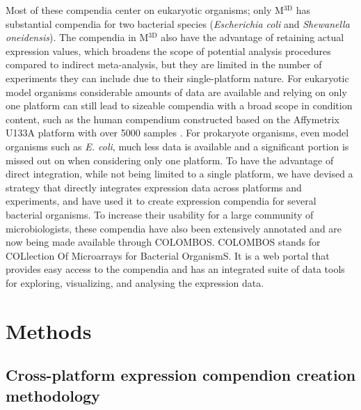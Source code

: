 Most of these compendia center on eukaryotic organisms; only M$^{\textrm{3D}}$ 
has substantial compendia for two bacterial species ({\it Escherichia coli} and 
{\it Shewanella oneidensis}). The compendia in M$^{\textrm{3D}}$ also have the 
advantage of retaining actual expression values, which broadens the scope of 
potential analysis procedures compared to indirect meta-analysis, but they are 
limited in the number of experiments they can include due to their 
single-platform nature. For eukaryotic model organisms considerable amounts of 
data are available and relying on only one platform can still lead to sizeable 
compendia with a broad scope in condition content, such as the human compendium 
constructed based on the Affymetrix U133A platform with over 5000 samples 
\cite{Lukk2010}. For prokaryote organisms, even model organisms such as {\it E. 
coli}, much less data is available and a significant portion is missed out on 
when considering only one platform. To have the advantage of direct 
integration, while not being limited to a single platform, we have devised a 
strategy that directly integrates expression data across platforms and 
experiments, and have used it to create expression compendia for several 
bacterial organisms. To increase their usability for a large community of 
microbiologists, these compendia have also been extensively annotated and are 
now being made available through COLOMBOS. COLOMBOS stands 
for COLlection Of Microarrays for Bacterial OrganismS. It is a web portal that 
provides easy access to the compendia and has an integrated suite of data tools 
for exploring, visualizing, and analysing the expression data.



\section{Methods}


\subsection{Cross-platform expression compendion creation 
methodology}\label{sec:colombos-comp-method}

